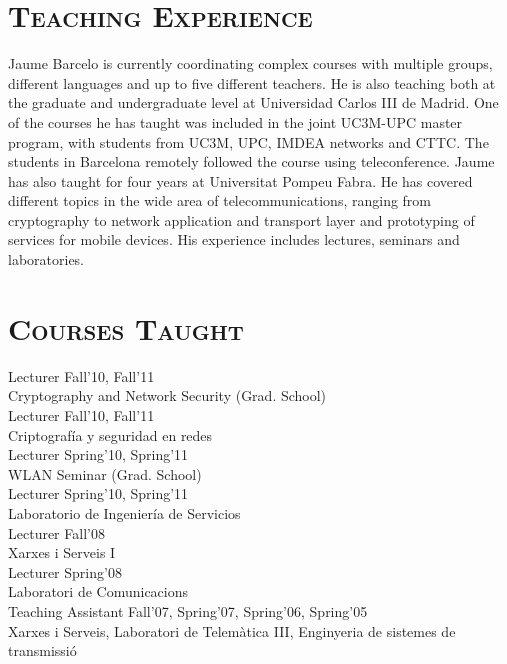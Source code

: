 \documentclass[line,margin]{res}
\begin{document}
\begin{resume}
\section{\textsc{Teaching Experience}}
Jaume Barcelo is currently coordinating complex courses with multiple groups, different languages and up to five different teachers.
He is also teaching both at the graduate and undergraduate level at Universidad Carlos III de Madrid.
One of the courses he has taught was included in the joint UC3M-UPC master program, with students from UC3M, UPC, IMDEA networks and CTTC.
The students in Barcelona remotely followed the course using teleconference.
Jaume has also taught for four years at Universitat Pompeu Fabra.
He has covered different topics in the wide area of telecommunications, ranging from cryptography to network application and transport layer and prototyping of services for mobile devices.
His experience includes lectures, seminars and laboratories.

\section{\textsc{Courses Taught}}
Lecturer
\hfill {Fall'10, Fall'11}\\
Cryptography and Network Security (Grad. School) \\
\newline
Lecturer
\hfill {Fall'10, Fall'11}\\
Criptografía y seguridad en redes\\
\newline
Lecturer
\hfill {Spring'10, Spring'11}\\
WLAN Seminar (Grad. School)\\
\newline
Lecturer
\hfill {Spring'10, Spring'11}\\
Laboratorio de Ingeniería de Servicios\\
\newline
Lecturer
\hfill {Fall'08}\\
Xarxes i Serveis I\\
\newline
Lecturer
\hfill {Spring'08}\\
Laboratori de Comunicacions\\
\newline
Teaching Assistant
\hfill {Fall'07, Spring'07, Spring'06, Spring'05}\\
Xarxes i Serveis, Laboratori de Telemàtica III, Enginyeria de sistemes de transmissió


\end{resume}
\end{document}
